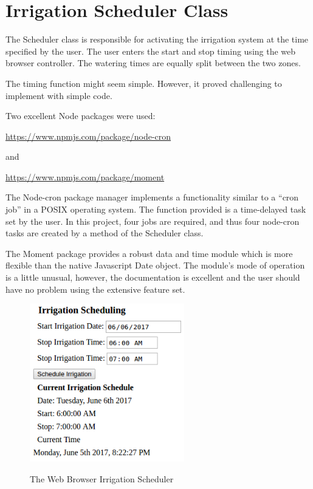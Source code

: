 \chapter{Irrigation Scheduler Class}

The Scheduler class is responsible for activating the irrigation system at the 
time specified by the user.  The user enters the start and stop timing using 
the web browser controller.  The watering times are equally split between the 
two zones.

The timing function might seem simple.  However, it proved challenging to 
implement with simple code.

Two excellent Node packages were used:

\url{https://www.npmjs.com/package/node-cron}

and

\url{https://www.npmjs.com/package/moment}

The Node-cron package manager implements a functionality similar to a ``cron 
job'' in a POSIX operating system.  The function provided is a time-delayed 
task set by the user.  In this project, four jobs are required, and thus four 
node-cron tasks are created by a method of the Scheduler class.

The Moment package provides a robust data and time module which is more 
flexible than the native Javascript Date object.  The module's mode of 
operation is a little unusual, however, the documentation is excellent and the 
user should have no problem using the extensive feature set.

\begin{figure}[H]
	\centering
	\includegraphics[width=0.6\textwidth]{photos/scheduler.png}
	\centering\bfseries
	\caption{The Web Browser Irrigation Scheduler}
\end{figure}

